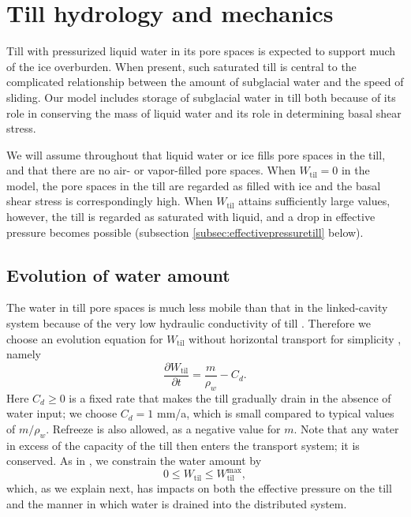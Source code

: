 \documentclass[gmd]{copernicus}   %
\newcommand{\text}{\textrm}
\newcommand{\Wtil}{W_{\text{til}}}
\newcommand{\Wtilmax}{W_{\text{til}}^{\text{max}}}
\begin{document}
\section{Till hydrology and mechanics} \label{sec:tillmechanics}

Till with pressurized liquid water in its pore spaces is expected to support much of the ice overburden.  When present, such saturated till is central to the complicated relationship between the amount of subglacial water and the speed of sliding.  Our model includes storage of subglacial water in till both because of its role in conserving the mass of liquid water and its role in determining basal shear stress.

We will assume throughout that liquid water or ice fills pore spaces in the till, and that there are no air- or vapor-filled pore spaces.  When $\Wtil=0$ in the model, the pore spaces in the till are regarded as filled with ice and the basal shear stress is correspondingly high.  When $\Wtil$ attains sufficiently large values, however, the till is regarded as saturated with liquid, and a drop in effective pressure becomes possible (subsection \ref{subsec:effectivepressuretill} below).

\subsection{Evolution of water amount}  The water in till pore spaces is much less mobile than that in the linked-cavity system because of the very low hydraulic conductivity of till \citep{LingleBrown1987,TrufferEchelmeyerHarrison2001}.  Therefore we choose an evolution equation for $\Wtil$ without horizontal transport for simplicity \citep{BBssasliding,Tulaczyketal2000}, namely
\begin{equation}
\frac{\partial \Wtil}{\partial t} = \frac{m}{\rho_w} - C_d. \label{eq:tilldynamics}
\end{equation}
Here $C_d\ge 0$ is a fixed rate that makes the till gradually drain in the absence of water input; we choose $C_d=1$ mm/a, which is small compared to typical values of $m/\rho_w$.  Refreeze is also allowed, as a negative value for $m$.  Note that any water in excess of the capacity of the till then enters the transport system; it is conserved.  As in \citep{BBssasliding}, we constrain the water amount by
\begin{equation}
0 \le \Wtil \le \Wtilmax,  \label{eq:Wtilbounds}
\end{equation}
which, as we explain next, has impacts on both the effective pressure on the till and the manner in which water is drained into the distributed system.
\end{document}
